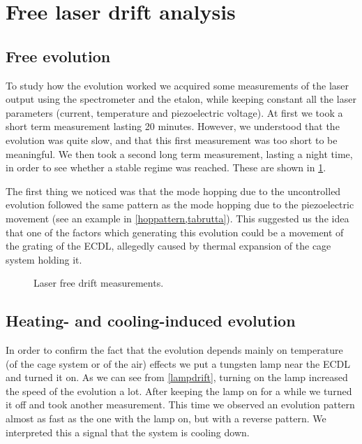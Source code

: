 \section{Free laser drift analysis}\label{freedrift}
\subsection{Free evolution}
To study how the evolution worked we acquired some measurements of the laser output using the spectrometer and the etalon, while keeping constant all the laser parameters (current, temperature and piezoelectric voltage). At first we took a short term measurement lasting 20 minutes. However, we understood that the evolution was quite slow, and that this first measurement was too short to be meaningful. We then took a second long term measurement, lasting a night time, in order to see whether a stable regime was reached. These are shown in \cref{senzaniente}.

The first thing we noticed was that the mode hopping due to the uncontrolled evolution followed the same pattern as the mode hopping due to the piezoelectric movement (see an example in \cref{hoppattern,tabrutta}). This suggested us the idea that one of the factors which generating this evolution could be a movement of the grating of the ECDL, allegedly caused by thermal expansion of the cage system holding it. 

\begin{figure}[!hptb]\centering
{} 
\caption{Laser free drift measurements.}
\label{senzaniente}
\end{figure} 
 
\subsection{Heating- and cooling-induced evolution}

In order to confirm the fact that the evolution depends mainly on temperature (of the cage system or of the air) effects we put a tungsten lamp near the ECDL and turned it on. As we can see from \cref{lampdrift}, turning on the lamp increased the speed of the evolution a lot. After keeping the lamp on for a while we turned it off and took another measurement. This time we observed an evolution pattern almost as fast as the one with the lamp on, but with a reverse pattern. We interpreted this a signal that the system is cooling down.

